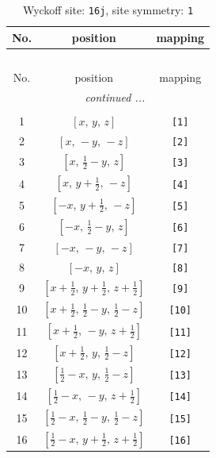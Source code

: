 \documentclass[fleqn,8pt]{jsarticle}
\begin{document}
\begin{longtable}{ccc}
\caption{Wyckoff site: {\tt 16j}, site symmetry: {\tt 1}}
 \\
 \hline \hline
No. & position & mapping \\ \hline \endfirsthead

\multicolumn{2}{l}{\tablename\ \thetable{}} \\
 \hline \hline
No. & position & mapping \\ \hline \endhead

 \hline \hline
\multicolumn{2}{r}{\footnotesize\it continued ...} \\ \endfoot

 \hline \hline
\multicolumn{2}{r}{} \\ \endlastfoot

1 & $\left[ x,\, y,\, z \right]$ & {\tt [1]} \\ \hline
2 & $\left[ x,\, - y,\, - z \right]$ & {\tt [2]} \\ \hline
3 & $\left[ x,\, \frac{1}{2} - y,\, z \right]$ & {\tt [3]} \\ \hline
4 & $\left[ x,\, y + \frac{1}{2},\, - z \right]$ & {\tt [4]} \\ \hline
5 & $\left[ - x,\, y + \frac{1}{2},\, - z \right]$ & {\tt [5]} \\ \hline
6 & $\left[ - x,\, \frac{1}{2} - y,\, z \right]$ & {\tt [6]} \\ \hline
7 & $\left[ - x,\, - y,\, - z \right]$ & {\tt [7]} \\ \hline
8 & $\left[ - x,\, y,\, z \right]$ & {\tt [8]} \\ \hline
9 & $\left[ x + \frac{1}{2},\, y + \frac{1}{2},\, z + \frac{1}{2} \right]$ & {\tt [9]} \\ \hline
10 & $\left[ x + \frac{1}{2},\, \frac{1}{2} - y,\, \frac{1}{2} - z \right]$ & {\tt [10]} \\ \hline
11 & $\left[ x + \frac{1}{2},\, - y,\, z + \frac{1}{2} \right]$ & {\tt [11]} \\ \hline
12 & $\left[ x + \frac{1}{2},\, y,\, \frac{1}{2} - z \right]$ & {\tt [12]} \\ \hline
13 & $\left[ \frac{1}{2} - x,\, y,\, \frac{1}{2} - z \right]$ & {\tt [13]} \\ \hline
14 & $\left[ \frac{1}{2} - x,\, - y,\, z + \frac{1}{2} \right]$ & {\tt [14]} \\ \hline
15 & $\left[ \frac{1}{2} - x,\, \frac{1}{2} - y,\, \frac{1}{2} - z \right]$ & {\tt [15]} \\ \hline
16 & $\left[ \frac{1}{2} - x,\, y + \frac{1}{2},\, z + \frac{1}{2} \right]$ & {\tt [16]} \\
\end{longtable}
\end{document}
